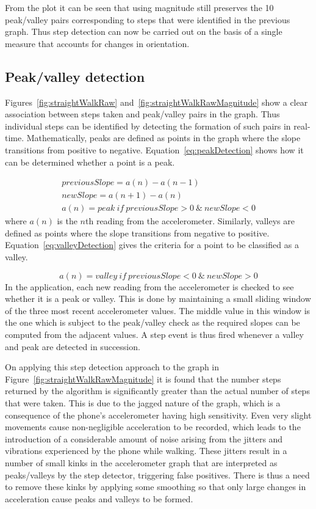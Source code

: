 \documentclass[main.tex]{subfiles}
\begin{document}
From the plot it can be seen that using magnitude still preserves the 10 peak/valley pairs corresponding to steps that were identified in the previous graph. Thus step detection can now be carried out on the basis of a single measure that accounts for changes in orientation. 

\subsection{Peak/valley detection}

Figures~\ref{fig:straightWalkRaw} and~\ref{fig:straightWalkRawMagnitude} show a clear association between steps taken and peak/valley pairs in the graph. Thus individual steps can be identified by detecting the formation of such pairs in real-time. Mathematically, peaks are defined as points in the graph where the slope transitions from positive to negative. Equation~\ref{eq:peakDetection} shows how it can be determined whether a point is a peak. 

\begin{equation}\label{eq:peakDetection}
\begin{split}
previousSlope = a(n) - a(n-1) \\
newSlope = a(n+1) - a(n) \\
a(n) = peak\ if\ previousSlope > 0\ \&\ newSlope < 0
\end{split}
\end{equation}
where $a(n)$ is the $n$th reading from the accelerometer. Similarly, valleys are defined as points where the slope transitions from negative to positive. Equation~\ref{eq:valleyDetection} gives the criteria for a point to be classified as a valley. 

\begin{equation}\label{eq:valleyDetection}
a(n) = valley\ if\ previousSlope < 0\ \&\ newSlope > 0
\end{equation}
In the application, each new reading from the accelerometer is checked to see whether it is a peak or valley. This is done by maintaining a small sliding window of the three most recent accelerometer values. The middle value in this window is the one which is subject to the peak/valley check as the required slopes can be computed from the adjacent values. A step event is thus fired whenever a valley and peak are detected in succession.  

On applying this step detection approach to the graph in Figure~\ref{fig:straightWalkRawMagnitude} it is found that the number steps returned by the algorithm is significantly greater than the actual number of steps that were taken. This is due to the jagged nature of the graph, which is a consequence of the phone's accelerometer having high sensitivity. Even very slight movements cause non-negligible acceleration to be recorded, which leads to the introduction of a considerable amount of noise arising from the jitters and vibrations experienced by the phone while walking. These jitters result in a number of small kinks in the accelerometer graph that are interpreted as peaks/valleys by the step detector, triggering false positives. There is thus a need to remove these kinks by applying some smoothing so that only large changes in acceleration cause peaks and valleys to be formed.  
\end{document}
